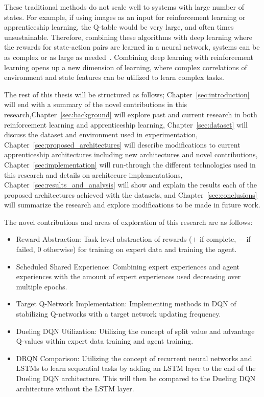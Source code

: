 \documentclass[12pt,american]{report}
\begin{document}
These traditional methods do not scale well to systems with large number of states.  For example, if using images as an input for reinforcement learning or apprenticeship learning, the Q-table would be very large, and often times unsustainable.  Therefore, combining these algorithms with deep learning where the rewards for state-action pairs are learned in a neural network, systems can be as complex or as large as needed~\cite{matiisen_2015}. Combining deep learning with reinforcement learning opens up a new dimension of learning, where complex correlations of environment and state features can be utilized to learn complex tasks.

The rest of this thesis will be structured as follows; Chapter~\ref{sec:introduction} will end with a summary of the novel contributions in this research,Chapter~\ref{sec:background} will explore past and current research in both reinforcement learning and apprenticeship learning, Chapter~\ref{sec:dataset} will discuss the dataset and environment used in experimentation, Chapter~\ref{sec:proposed_architectures} will describe modifications to current apprenticeship architectures including new architectures and novel contributions, Chapter~\ref{sec:implementation} will run-through the different technologies used in this research and details on architecure implementations, Chapter~\ref{sec:results_and_analysis} will show and explain the results each of the proposed architectures achieved with the datasets, and Chapter~\ref{sec:conclusions} will summarize the research and explore modifications to be made in future work.

The novel contributions and areas of exploration of this research are as follows:
\begin{itemize}
  \item Reward Abstraction: Task level abstraction of rewards ($+$ if complete, $-$ if failed, $0$ otherwise) for training on expert data and training the agent.
  \item Scheduled Shared Experience: Combining expert experiences and agent experiences with the amount of expert experiences used decreasing over multiple epochs.
  \item Target Q-Network Implementation: Implementing methods in DQN of stabilizing Q-networks with a target network updating frequency.
  \item Dueling DQN Utilization: Utilizing the concept of split value and advantage Q-values within expert data training and agent training.
  \item DRQN Comparison: Utilizing the concept of recurrent neural networks and LSTMs to learn sequential tasks by adding an LSTM layer to the end of the Dueling DQN architecture. This will then be compared to the Dueling DQN architecture without the LSTM layer.
\end{itemize}
\end{document}
